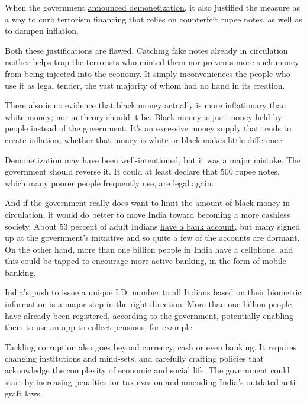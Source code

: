 When the government
\href{http://finmin.nic.in/press_room/2016/press_cancellation_high_denomination_notes.pdf}{announced
demonetization}, it also justified the measure as a way to curb
terrorism financing that relies on counterfeit rupee notes, as well as
to dampen inflation.

Both these justifications are flawed. Catching fake notes already in
circulation neither helps trap the terrorists who minted them nor
prevents more such money from being injected into the economy. It simply
inconveniences the people who use it as legal tender, the vast majority
of whom had no hand in its creation.

There also is no evidence that black money actually is more inflationary
than white money; nor in theory should it be. Black money is just money
held by people instead of the government. It's an excessive money supply
that tends to create inflation; whether that money is white or black
makes little difference.

Demonetization may have been well-intentioned, but it was a major
mistake. The government should reverse it. It could at least declare
that 500 rupee notes, which many poorer people frequently use, are legal
again.

And if the government really does want to limit the amount of black
money in circulation, it would do better to move India toward becoming a
more cashless society. About 53 percent of adult Indians
\href{http://datatopics.worldbank.org/financialinclusion/country/india}{have
a bank account}, but many signed up at the government's initiative and
so quite a few of the accounts are dormant. On the other hand, more than
one billion people in India have a cellphone, and this could be tapped
to encourage more active banking, in the form of mobile banking.

India's push to issue a unique I.D. number to all Indians based on their
biometric information is a major step in the right direction.
\href{https://portal.uidai.gov.in/uidwebportal/dashboard.do}{More than
one billion people} have already been registered, according to the
government, potentially enabling them to use an app to collect pensions,
for example.

Tackling corruption also goes beyond currency, cash or even banking. It
requires changing institutions and mind-sets, and carefully crafting
policies that acknowledge the complexity of economic and social life.
The government could start by increasing penalties for tax evasion and
amending India's outdated anti-graft laws.

